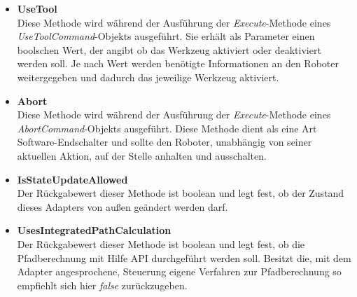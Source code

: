 \begin{itemize}
\item \textbf{UseTool}\\
Diese Methode wird während der Ausführung der \textit{Execute}-Methode eines \textit{UseToolCommand}-Objekts ausgeführt. Sie erhält als Parameter einen boolschen Wert, der angibt ob das Werkzeug aktiviert oder deaktiviert werden soll. Je nach Wert werden benötigte Informationen an den Roboter weitergegeben und dadurch das jeweilige Werkzeug aktiviert.
\item \textbf{Abort}\\
Diese Methode wird während der Ausführung der \textit{Execute}-Methode eines \textit{AbortCommand}-Objekts ausgeführt. Diese Methode dient als eine Art Software-Endschalter und sollte den Roboter, unabhängig von seiner aktuellen Aktion, auf der Stelle anhalten und ausschalten. 
\item \textbf{IsStateUpdateAllowed}\\
Der Rückgabewert dieser Methode ist boolean und legt fest, ob der Zustand dieses Adapters von außen geändert werden darf.
\item \textbf{UsesIntegratedPathCalculation}\\
Der Rückgabewert dieser Methode ist boolean und legt fest, ob die Pfadberechnung mit Hilfe API durchgeführt werden soll. Besitzt die, mit dem Adapter angesprochene, Steuerung eigene Verfahren zur Pfadberechnung so empfiehlt sich hier \textit{false} zurückzugeben.
\end{itemize}

